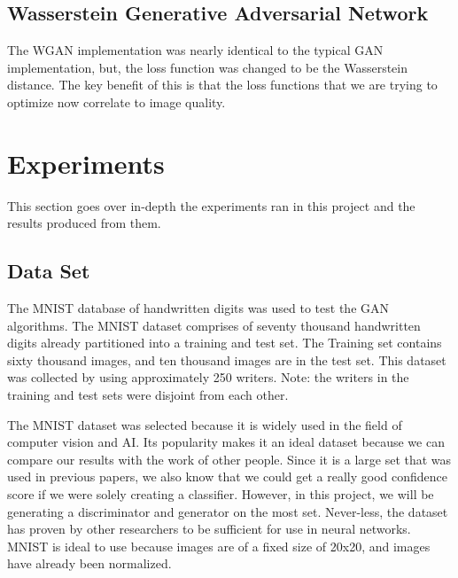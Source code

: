 \documentclass[12pt,
 reprint,
nofootinbib,
 amsmath,amssymb,
 aps,
floatfix,
]{revtex4-2}
\begin{document}
\subsection{\label{sec:impWGAN}Wasserstein Generative Adversarial Network}


The WGAN implementation was nearly identical to the typical GAN implementation, but, the loss function was changed to be the Wasserstein distance. The key benefit of this is that the loss functions that we are trying to optimize now correlate to image quality. 



\section{\label{sec:exp}Experiments}

This section goes over in-depth the experiments ran in this project and the results produced from them.


\subsection{\label{sec:dataSet}Data Set}


The MNIST database of handwritten digits was used to test the GAN algorithms. The MNIST dataset comprises of seventy thousand handwritten digits already partitioned into a training and test set. The Training set contains sixty thousand images, and ten thousand images are in the test set. This dataset was collected by using approximately 250 writers. Note: the writers in the training and test sets were disjoint from each other.

The MNIST dataset was selected because it is widely used in the field of computer vision and AI. Its popularity makes it an ideal dataset because we can compare our results with the work of other people. Since it is a large set that was used in previous papers, we also know that we could get a really good confidence score if we were solely creating a classifier. However, in this project, we will be generating a discriminator and generator on the most set. Never-less, the dataset has proven by other researchers to be sufficient for use in neural networks. MNIST is ideal to use because images are of a fixed size of 20x20, and images have already been normalized. 
\end{document}
